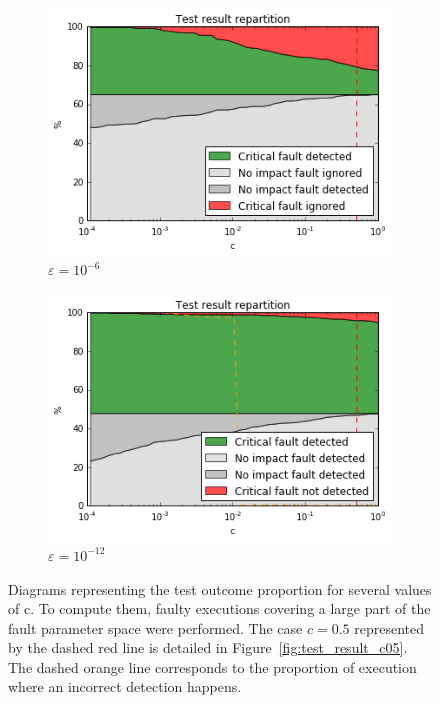 \begin{figure}[h]
\begin{minipage}[b]{0.48\linewidth}
	\begin{subfigure}[t]{\linewidth}
		\centering
		\includegraphics[width=1.1\linewidth]{figures/pores_2/test_result_0.png}
		\caption{$\varepsilon = 10^{-6}$}\label{fig:pores_2_test_result_0}	
	\end{subfigure}
    \quad
    \begin{subfigure}[t]{\linewidth}
		\centering
		\includegraphics[width=1.1\linewidth]{figures/pores_2/test_result_1.png}
		\caption{$\varepsilon = 10^{-12}$}\label{fig:pores_2_test_result_1}	
	\end{subfigure}

	\end{minipage}
\caption{Diagrams representing the test outcome proportion for several values of c. To compute them, faulty executions covering a large part of the fault parameter space were performed. The case $c = 0.5$ represented by the dashed red line is detailed in Figure~\ref{fig:test_result_c05}. The dashed orange line corresponds to the proportion of execution where an incorrect detection happens.}\label{fig:test_result}
\end{figure}




